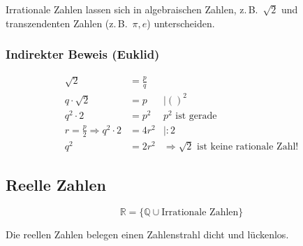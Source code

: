 Irrationale Zahlen lassen sich in algebraischen Zahlen, z.\,B.\ \( \sqrt{2} \) und transzendenten Zahlen (z.\,B.\ \( \pi, e \)) unterscheiden.

\subsubsection{Indirekter Beweis (Euklid)}

\[
	\begin{alignedat}{2}
		\sqrt{2} &= \frac{p}{q} \\
		q \cdot \sqrt{2} &= p &\mid {()}^2 \\
		q^2 \cdot 2 &= p^2 &p^2 \text{ ist gerade} \\
		r = \frac{p}{2} \Rightarrow q^2 \cdot 2 &= 4r^2  &\mid :2 \\
		q^2 &= 2r^2 &\Rightarrow \sqrt{2} \text{ ist keine rationale Zahl!}
	\end{alignedat}
\]

\subsection{Reelle Zahlen}

\[
	\mathbb{R} = \{\mathbb{Q} \cup \text{Irrationale Zahlen}\}
\]

Die reellen Zahlen belegen einen Zahlenstrahl dicht und lückenlos.


